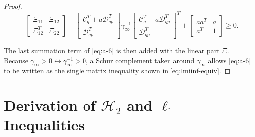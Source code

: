 \begin{proof}
	\begin{equation} \label{eq:a-6}
		-\begin{bmatrix}
			\Xi_{11} & \Xi_{12} \\
			\Xi_{12}^T & \Xi_{22}
		\end{bmatrix}
		-\begin{bmatrix}
			\mathcal{C}_q^T + a\mathcal{D}_{qp}^T \\
			\mathcal{D}_{qp}^T
		\end{bmatrix}
		\gamma_\infty^{-1}
		\begin{bmatrix}
			\mathcal{C}_q^T + a\mathcal{D}_{qp}^T \\
			\mathcal{D}_{qp}^T
		\end{bmatrix}^T +
		\begin{bmatrix}
			aa^T & a \\
			a^T & 1
		\end{bmatrix}
		\geq 0.
	\end{equation}
	
	The last summation term of \autoref{eq:a-6} is then added with the linear part $\Xi$. Because $\gamma_\infty > 0 \leftrightarrow \gamma_\infty^{-1} > 0$, a Schur complement taken around $\gamma_\infty$ allows \autoref{eq:a-6} to be written as the single matrix inequality shown in \autoref{eq:lmiinf-equiv}.

\end{proof}

\section{Derivation of $\mathcal{H}_2$ and $\ell_1$ Inequalities}
\label{sec:apd-a-2}

